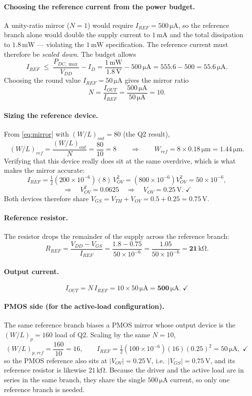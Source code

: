 \documentclass[12pt,a4paper]{article}
\newcommand{\U}[1]{\,\mathrm{#1}}
\newcommand{\WLi}[1]{\left(W/L\right)_{#1}}
\begin{document}
\paragraph{Choosing the reference current from the power budget.}
A unity-ratio mirror ($N=1$) would require $I_{REF}=500\U{\mu A}$, so the
reference branch alone would double the supply current to $1\U{mA}$ and the
total dissipation to $1.8\U{mW}$ --- violating the $1\U{mW}$ specification.
The reference current must therefore be \emph{scaled down}. The budget allows
\[
I_{REF} \;\leq\; \frac{P_{DC,\max}}{V_{DD}} - I_D
        = \frac{1\U{mW}}{1.8\U{V}} - 500\U{\mu A}
        = 555.6 - 500 = 55.6\U{\mu A}.
\]
Choosing the round value $I_{REF} = 50\U{\mu A}$ gives the mirror ratio
\[
N = \frac{I_{OUT}}{I_{REF}} = \frac{500\U{\mu A}}{50\U{\mu A}} = 10 .
\]

\paragraph{Sizing the reference device.}
From \eqref{eq:mirror} with $\WLi{out} = 80$ (the Q2 result),
\[
\WLi{ref} = \frac{\WLi{out}}{N} = \frac{80}{10} = 8
\qquad\Longrightarrow\qquad
W_{ref} = 8 \times 0.18\U{\mu m} = 1.44\U{\mu m}.
\]
Verifying that this device really does sit at the same overdrive, which is
what makes the mirror accurate:
\[
I_{REF} = \tfrac{1}{2}(200\times10^{-6})(8)\,V_{OV}^{2}
        = (800\times10^{-6})V_{OV}^{2} = 50\times10^{-6},
\]
\[
\Rightarrow\quad V_{OV}^{2} = 0.0625
\quad\Rightarrow\quad
V_{OV} = 0.25\U{V}.\;\checkmark
\]
Both devices therefore share $V_{GS} = V_{TH}+V_{OV} = 0.5+0.25 = 0.75\U{V}$.

\paragraph{Reference resistor.}
The resistor drops the remainder of the supply across the reference branch:
\[
R_{REF} = \frac{V_{DD}-V_{GS}}{I_{REF}}
        = \frac{1.8 - 0.75}{50\times10^{-6}}
        = \frac{1.05}{50\times10^{-6}}
        = \mathbf{21\U{k\Omega}}.
\]

\paragraph{Output current.}
\[
I_{OUT} = N\,I_{REF} = 10 \times 50\U{\mu A} = \mathbf{500\U{\mu A}}.\;\checkmark
\]

\paragraph{PMOS side (for the active-load configuration).}
The same reference branch biases a PMOS mirror whose output device is the
$\WLi{p}=160$ load of Q2. Scaling by the same $N = 10$,
\[
\WLi{p,ref} = \frac{160}{10} = 16,
\qquad
I_{REF} = \tfrac{1}{2}(100\times10^{-6})(16)(0.25)^{2} = 50\U{\mu A},\;\checkmark
\]
so the PMOS reference also sits at $|V_{OV}| = 0.25\U{V}$, i.e.\
$|V_{GS}| = 0.75\U{V}$, and its reference resistor is likewise $21\U{k\Omega}$.
Because the driver and the active load are in series in the same branch, they
share the single $500\U{\mu A}$ current, so only one reference branch is
needed.
\end{document}
